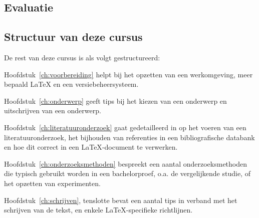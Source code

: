 \lipsum[15]

\subsection{Evaluatie}
\label{sec:evaluatie}

\lipsum[16-18]


\subsection{Structuur van deze cursus}
\label{sec:structuur}

De rest van deze cursus is als volgt gestructureerd:

Hoofdstuk~\ref{ch:voorbereiding} helpt bij het opzetten van een werkomgeving, meer bepaald {\LaTeX} en een versiebeheersysteem.

Hoofdstuk~\ref{ch:onderwerp} geeft tips bij het kiezen van een onderwerp en uitschrijven van een onderwerp.

Hoofdstuk~\ref{ch:literatuuronderzoek} gaat gedetailleerd in op het voeren van een literatuuronderzoek, het bijhouden van referenties in een bibliografische databank en hoe dit correct in een {\LaTeX}-document te verwerken.

Hoofdstuk~\ref{ch:onderzoeksmethoden} bespreekt een aantal onderzoeksmethoden die typisch gebruikt worden in een bachelorproef, o.a. de vergelijkende studie, of het opzetten van experimenten.

Hoofdstuk~\ref{ch:schrijven}, tenslotte bevat een aantal tips in verband met het schrijven van de tekst, en enkele {\LaTeX}-specifieke richtlijnen.
